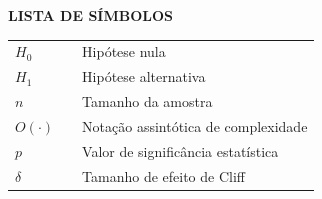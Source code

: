 
\begin{center}
    \textbf{LISTA DE SÍMBOLOS}
    \vspace{1cm}
\end{center}

\begin{table}[h]
    \begin{tabular}{lcl}
        $H_0$ & \hspace{0.5cm} & Hipótese nula \\
        $H_1$ & \hspace{0.5cm} & Hipótese alternativa \\
        $n$ & \hspace{0.5cm} & Tamanho da amostra \\
        $O(\cdot)$ & \hspace{0.5cm} & Notação assintótica de complexidade \\
        $p$ & \hspace{0.5cm} & Valor de significância estatística \\
        $\delta$ & \hspace{0.5cm} & Tamanho de efeito de Cliff
    \end{tabular}
\end{table}